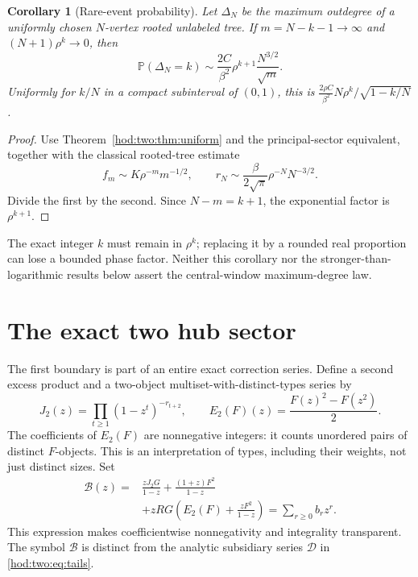 \documentclass[11pt,letterpaper]{article}
\newtheorem{corollary}[theorem]{Corollary}
\theoremstyle{definition}\newtheorem{definition}[theorem]{Definition}
\theoremstyle{remark}\newtheorem{remark}[theorem]{Remark}
\newcommand{\Pp}{\mathbb P}
\newcommand{\Bcal}{\mathcal B}
\newcommand{\Dcal}{\mathcal D}
\begin{document}
\begin{corollary}[Rare-event probability]\label{hod:two:cor:prob}
Let $\Delta_N$ be the maximum outdegree of a uniformly chosen $N$-vertex rooted unlabeled tree. If $m=N-k-1\to\infty$ and $(N+1)\rho^k\to0$, then
\begin{equation}\label{hod:two:eq:prob}
\Pp(\Delta_N=k)\sim\frac{2C}{\beta^2}\rho^{k+1}
\frac{N^{3/2}}{\sqrt m}.
\end{equation}
Uniformly for $k/N$ in a compact subinterval of $(0,1)$, this is
$\frac{2\rho C}{\beta^2}N\rho^k/\sqrt{1-k/N}$.
\end{corollary}
\begin{proof}
Use Theorem~\ref{hod:two:thm:uniform} and the principal-sector equivalent, together with the classical rooted-tree estimate
\[
f_m\sim K\rho^{-m}m^{-1/2},\qquad
r_N\sim\frac{\beta}{2\sqrt\pi}\rho^{-N}N^{-3/2}.
\]
Divide the first by the second. Since $N-m=k+1$, the exponential factor is $\rho^{k+1}$.
\end{proof}
The exact integer $k$ must remain in $\rho^k$; replacing it by a rounded real proportion can lose a bounded phase factor. Neither this corollary nor the stronger-than-logarithmic results below assert the central-window maximum-degree law.

\section{The exact two hub sector}\label{hod:two:sec:twohub}
The first boundary is part of an entire exact correction series. Define a second excess product and a two-object multiset-with-distinct-types series by
\begin{equation}\label{hod:two:eq:Jtwo}
J_2(z)=\prod_{t\ge1}(1-z^t)^{-r_{t+2}},\qquad
E_2(F)(z)=\frac{F(z)^2-F(z^2)}2.
\end{equation}
The coefficients of $E_2(F)$ are nonnegative integers: it counts unordered pairs of distinct $F$-objects. This is an interpretation of types, including their weights, not just distinct sizes. Set
\begin{equation}\label{hod:two:eq:defectpositive}
\begin{split}
\Bcal(z)={}&\frac{zJ_2G}{1-z}+\frac{(1+z)F^2}{1-z}\\
&+zRG\left(E_2(F)+\frac{zF^2}{1-z}\right)
=\sum_{r\ge0}b_rz^r.
\end{split}
\end{equation}
This expression makes coefficientwise nonnegativity and integrality transparent. The symbol $\Bcal$ is distinct from the analytic subsidiary series $\Dcal$ in \eqref{hod:two:eq:tails}.
\end{document}
